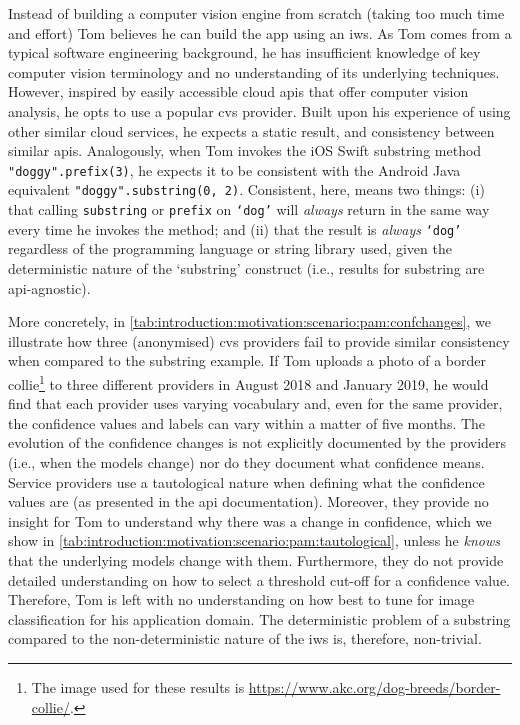 Instead of building a computer vision engine from scratch (taking too much time and effort) Tom believes he can build the app using an \gls{iws}. As Tom comes from a typical software engineering background, he has insufficient knowledge of key computer vision terminology and no understanding of its underlying techniques. However, inspired by easily accessible cloud \glspl{api} that offer computer vision analysis, he opts to use a popular \gls{cvs} provider. Built upon his experience of using other similar cloud services, he expects a static result, and consistency between similar \glspl{api}. Analogously, when Tom invokes the iOS Swift substring method \texttt{"doggy".prefix(3)}, he expects it to be consistent with the Android Java equivalent \texttt{"doggy".substring(0, 2)}. Consistent, here, means two things: (i) that calling \texttt{substring} or \texttt{prefix} on \texttt{`dog'} will \textit{always} return in the same way every time he invokes the method; and (ii) that the result is \textit{always} \texttt{`dog'} regardless of the programming language or string library used, given the deterministic nature of the `substring' construct (i.e., results for substring are \gls{api}-agnostic). 



More concretely, in \cref{tab:introduction:motivation:scenario:pam:confchanges}, we illustrate how three (anonymised) \gls{cvs} providers fail to provide similar consistency when compared to the substring example. If Tom uploads a photo of a border collie\footnote{The image used for these results is \url{https://www.akc.org/dog-breeds/border-collie/}.} to three different providers in August 2018 and January 2019, he would find that each provider uses varying vocabulary and, even for the same provider, the confidence values and labels can vary within a matter of five months. The evolution of the confidence changes is not explicitly documented by the providers (i.e., when the models change) nor do they document what confidence means. Service providers use a tautological nature when defining what the confidence values are (as presented in the \gls{api} documentation). Moreover, they provide no insight for Tom to understand why there was a change in confidence, which we show in \cref{tab:introduction:motivation:scenario:pam:tautological}, unless he \textit{knows} that the underlying models change with them. Furthermore, they do not provide detailed understanding on how to select a threshold cut-off for a confidence value. Therefore, Tom is left with no understanding on how best to tune for image classification for his application domain. The deterministic problem of a substring compared to the non-deterministic nature of the \gls{iws} is, therefore, non-trivial.

